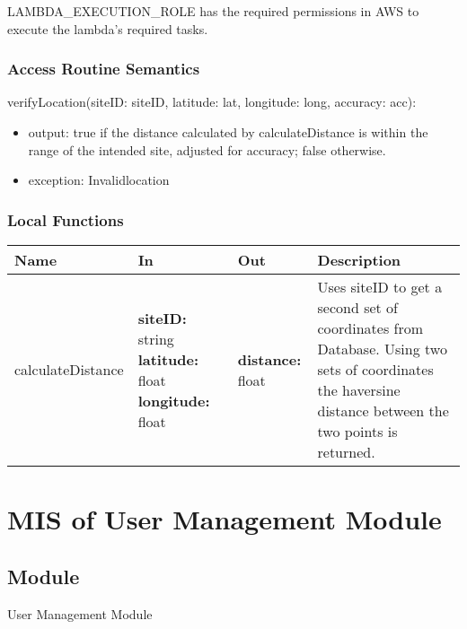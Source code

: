 \documentclass[12pt, titlepage]{article}
\begin{document}
{  LAMBDA\_EXECUTION\_ROLE has the required permissions in AWS to
  execute the lambda's required tasks.

  \subsubsection{Access Routine Semantics}

  \noindent verifyLocation(siteID: siteID, latitude: lat, longitude:
  long, accuracy: acc):
  \begin{itemize}
    \item output: true if the distance calculated by calculateDistance
      is within the range of the intended site, adjusted for accuracy;
      false otherwise.
    \item exception: Invalidlocation
  \end{itemize}

  \subsubsection{Local Functions}

  \begin{center}
    \begin{tabular}{>{\raggedright}p{3cm} >{\raggedright}p{4cm}
      >{\raggedright}p{4cm} p{4.5cm}}
      \hline
      \textbf{Name} & \textbf{In} & \textbf{Out} & \textbf{Description} \\
      \hline
      calculateDistance & \textbf{siteID:} string \newline
      \textbf{latitude:} float \newline
      \textbf{longitude:} float & \textbf{distance:} float &
      Uses siteID to get a second set of coordinates from Database.
      Using two sets of coordinates the haversine distance between the
      two points is returned. \\
      \hline
    \end{tabular}
  \end{center}

  \section{MIS of User Management Module}
  \label{sec:UM}

  \subsection{Module}

  User Management Module

}
\end{document}
